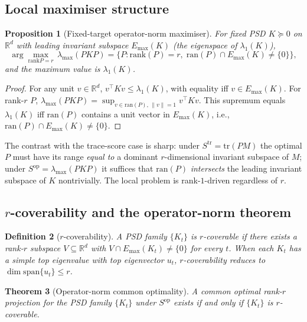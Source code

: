 \documentclass[final,3p,times]{elsarticle}
\newtheorem{theorem}{Theorem}
\newtheorem{proposition}[theorem]{Proposition}
\newtheorem{definition}[theorem]{Definition}
\newcommand{\tr}{\mathrm{tr}}
\newcommand{\R}{\mathbb{R}}
\newcommand{\rank}{\mathrm{rank}}
\newcommand{\ran}{\mathrm{ran}}
\newcommand{\Emax}{E_{\max}}
\begin{document}
\subsection{Local maximiser structure}

\begin{proposition}[Fixed-target operator-norm maximiser]\label{prop:localmax}
For fixed PSD $K\succeq 0$ on $\R^d$ with leading invariant subspace
$\Emax(K)$ (the eigenspace of $\lambda_1(K)$),
\begin{equation}\label{eq:localmax}
\arg\max_{\rank P=r}\,\lambda_{\max}(P K P)
=\bigl\{P:\rank(P)=r,\;\ran(P)\cap\Emax(K)\ne\{0\}\bigr\},
\end{equation}
and the maximum value is $\lambda_1(K)$.
\end{proposition}

\begin{proof}
For any unit $v\in\R^d$, $v^\top K v\le\lambda_1(K)$, with equality iff
$v\in\Emax(K)$.
For rank-$r$ $P$,
$\lambda_{\max}(PKP)=\sup_{v\in\ran(P),\,\|v\|=1}v^\top K v$.
This supremum equals $\lambda_1(K)$ iff $\ran(P)$ contains a unit vector
in $\Emax(K)$, i.e., $\ran(P)\cap\Emax(K)\ne\{0\}$.
\end{proof}

The contrast with the trace-score case is sharp: under
$S^{\mathrm{tr}}=\tr(PM)$ the optimal $P$ must have its range
\emph{equal to} a dominant $r$-dimensional invariant subspace of $M$;
under $S^{\mathrm{op}}=\lambda_{\max}(PKP)$ it suffices that
$\ran(P)$ \emph{intersects} the leading invariant subspace of $K$
nontrivially.
The local problem is rank-$1$-driven regardless of $r$.

\subsection{\texorpdfstring{$r$}{r}-coverability and the operator-norm theorem}

\begin{definition}[$r$-coverability]\label{def:cov}
A PSD family $\{K_t\}$ is \emph{$r$-coverable} if there exists a rank-$r$
subspace $V\subseteq\R^d$ with $V\cap\Emax(K_t)\ne\{0\}$ for every $t$.
When each $K_t$ has a simple top eigenvalue with top eigenvector $u_t$,
$r$-coverability reduces to $\dim\mathrm{span}\{u_t\}\le r$.
\end{definition}

\begin{theorem}[Operator-norm common optimality]\label{thm:caus}
A common optimal rank-$r$ projection for the PSD family $\{K_t\}$ under
$S^{\mathrm{op}}$ exists if and only if $\{K_t\}$ is $r$-coverable.
\end{theorem}
\end{document}
